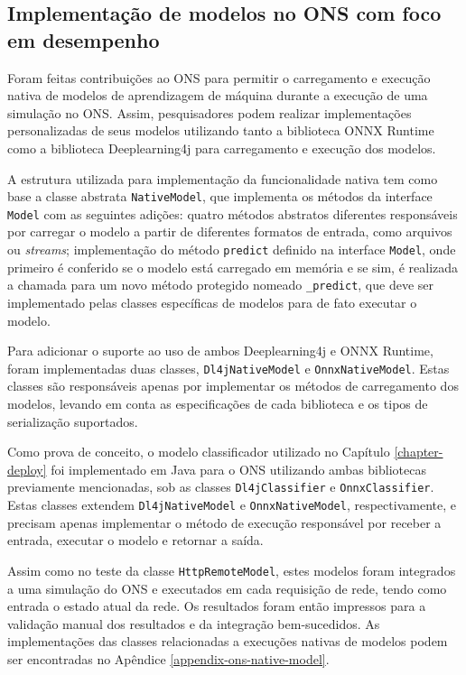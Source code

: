 \subsection{Implementação de modelos no ONS com foco em desempenho}

Foram feitas contribuições ao ONS para permitir o carregamento e execução nativa de modelos de aprendizagem de máquina durante a execução de uma simulação no ONS. Assim, pesquisadores podem realizar implementações personalizadas de seus modelos utilizando tanto a biblioteca ONNX Runtime como a biblioteca Deeplearning4j para carregamento e execução dos modelos.

A estrutura utilizada para implementação da funcionalidade nativa tem como base a classe abstrata \texttt{NativeModel}, que implementa os métodos da interface \texttt{Model} com as seguintes adições: quatro métodos abstratos diferentes responsáveis por carregar o modelo a partir de diferentes formatos de entrada, como arquivos ou \textit{streams}; implementação do método \texttt{predict} definido na interface \texttt{Model}, onde primeiro é conferido se o modelo está carregado em memória e se sim, é realizada a chamada para um novo método protegido nomeado \texttt{\_predict}, que deve ser implementado pelas classes específicas de modelos para de fato executar o modelo.

Para adicionar o suporte ao uso de ambos Deeplearning4j e ONNX Runtime, foram implementadas duas classes, \texttt{Dl4jNativeModel} e \texttt{OnnxNativeModel}. Estas classes são responsáveis apenas por implementar os métodos de carregamento dos modelos, levando em conta as especificações de cada biblioteca e os tipos de serialização suportados.

Como prova de conceito, o modelo classificador utilizado no Capítulo \ref{chapter-deploy} foi implementado em Java para o ONS utilizando ambas bibliotecas previamente mencionadas, sob as classes \texttt{Dl4jClassifier} e \texttt{OnnxClassifier}. Estas classes extendem \texttt{Dl4jNativeModel} e \texttt{OnnxNativeModel}, respectivamente, e precisam apenas implementar o método de execução responsável por receber a entrada, executar o modelo e retornar a saída.

Assim como no teste da classe \texttt{HttpRemoteModel}, estes modelos foram integrados a uma simulação do ONS e executados em cada requisição de rede, tendo como entrada o estado atual da rede. Os resultados foram então impressos para a validação manual dos resultados e da integração bem-sucedidos. As implementações das classes relacionadas a execuções nativas de modelos podem ser encontradas no Apêndice \ref{appendix-ons-native-model}.

